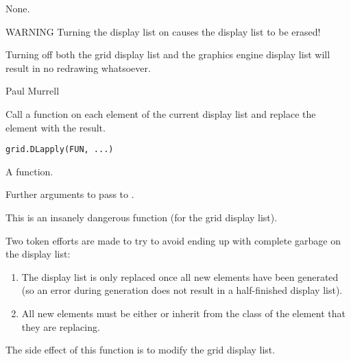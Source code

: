 %
\begin{Value}
None.
\end{Value}
%
\begin{Section}{WARNING}
Turning the display list on causes the display list to be erased!

Turning off both the grid display list and the graphics engine
display list will result in no redrawing whatsoever.
\end{Section}
%
\begin{Author}\relax
Paul Murrell
\end{Author}
%
\begin{Description}\relax
Call a function on each element of the current display list
and replace the element with the result.
\end{Description}
%
\begin{Usage}
\begin{verbatim}
grid.DLapply(FUN, ...)
\end{verbatim}
\end{Usage}
%
\begin{Arguments}
\begin{ldescription}
\item[\code{FUN}] A function.
\item[\code{...}] Further arguments to pass to  .
\end{ldescription}
\end{Arguments}
%
\begin{Details}\relax
This is an insanely dangerous function (for the grid display list).

Two token efforts are made to try to avoid ending up with complete
garbage on the display list:

\begin{enumerate}

\item The display list is only replaced once all new elements have
been generated (so an error during generation does not result in a
half-finished display list).
\item All new elements must be either  or inherit from
the class of the element that they are replacing.

\end{enumerate}

\end{Details}
%
\begin{Value}
The side effect of this function is to modify the grid display list.
\end{Value}
